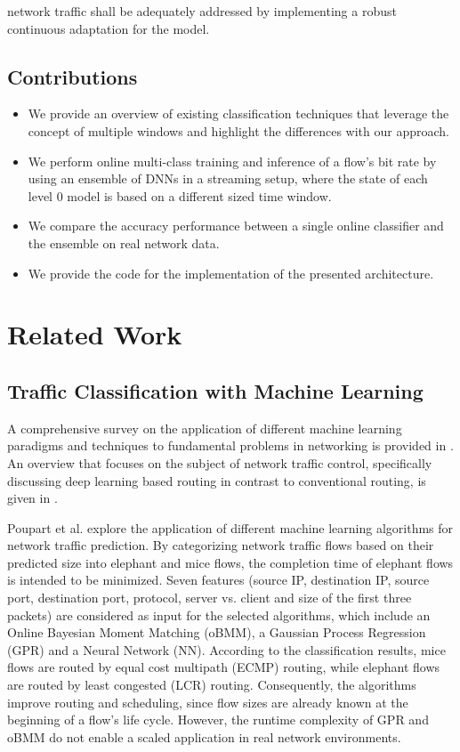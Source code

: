 \documentclass[conference]{IEEEtran}
\begin{document}
network traffic shall be adequately addressed by implementing a robust continuous adaptation for the model.

\subsection{Contributions}\label{sec:contributions}
\begin{itemize}
    \item We provide an overview of existing classification techniques that leverage the concept of multiple windows and highlight the differences with our approach.
    \item We perform online multi-class training and inference of a flow's bit rate by using an ensemble of DNNs in a streaming setup, where the state of each level $0$ model is based on a different sized time window.
    \item We compare the accuracy performance between a single online classifier and the ensemble on real network data.
    \item We provide the code for the implementation of the presented architecture.
\end{itemize}


\section{Related Work}\label{sec:related_work}
\subsection{Traffic Classification with Machine Learning}\label{sec:traffic_classification_with_machine_learning}

A comprehensive survey on the application of different machine learning paradigms and techniques to fundamental problems in networking is provided in \cite{boutaba2018comprehensive}. An overview that focuses on the subject of network traffic control, specifically discussing deep learning based routing in contrast to conventional routing, is given in \cite{fadlullah2017state}.

Poupart et al. \cite{poupart_online_2016} explore the application of different machine learning algorithms for network traffic prediction. By categorizing network traffic flows based on their predicted size into elephant and mice flows, the completion time of elephant flows is intended to be minimized. Seven features (source IP, destination IP, source port, destination port, protocol, server vs. client and size of the first three packets) are considered as input for the selected algorithms, which include an Online Bayesian Moment Matching (oBMM), a Gaussian Process Regression (GPR) and a Neural Network (NN). According to the classification results, mice flows are routed by equal cost multipath (ECMP) routing, while elephant flows are routed by least congested (LCR) routing. Consequently, the algorithms improve routing and scheduling, since flow sizes are already known at the beginning of a flow's life cycle. However, the runtime complexity of GPR and oBMM do not enable a scaled application in real network environments.
\end{document}

